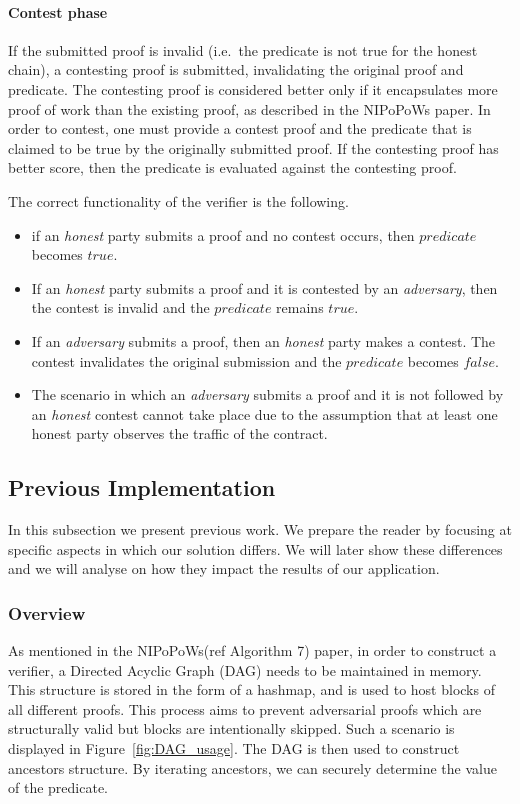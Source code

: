 \paragraph{Contest phase} If the submitted proof is invalid (i.e.\ the
predicate is not true for the honest chain), a contesting proof is
submitted, invalidating the original proof and predicate. The
contesting proof is considered better only if it encapsulates more
proof of work than the existing proof, as described in the NIPoPoWs
paper. In order to contest, one must provide a contest proof and the predicate
that is claimed to be true by the originally submitted proof. If the contesting
proof has better score, then the predicate is evaluated against the contesting
proof.

The correct functionality of the verifier is the following.
\begin{itemize}
    \item
        if an \textit{honest} party submits a proof and no contest occurs, then
        $predicate$ becomes $true$.
    \item
        If an \textit{honest} party submits a proof and it is contested by an
        \textit{adversary}, then the contest is invalid and the $predicate$
        remains $true$.
    \item
        If an \textit{adversary} submits a proof, then an \textit{honest} party
        makes a contest. The contest invalidates the original submission and
        the $predicate$ becomes $false$.
    \item
        The scenario in which an \textit{adversary} submits a proof and it is not
        followed by an \textit{honest} contest cannot take place due to the assumption
        that at least one honest party observes the traffic of the contract.
\end{itemize}

\subsection{Previous Implementation}

In this subsection we present previous work. We prepare the reader by focusing
at specific aspects in which our solution differs. We will later show these
differences and we will analyse on how they impact the results of our
application.

\subsubsection{Overview} As mentioned in the NIPoPoWs(ref Algorithm 7) paper,
in order to construct a verifier, a Directed Acyclic Graph (DAG) needs to be
maintained in memory. This structure is stored in the form of a hashmap, and is
used to host blocks of all different proofs. This process aims to prevent
adversarial proofs which are structurally valid but blocks are intentionally
skipped. Such a scenario is displayed in Figure~\ref{fig:DAG_usage}. The DAG is
then used to construct ancestors structure. By iterating ancestors, we can
securely determine the value of the predicate.

